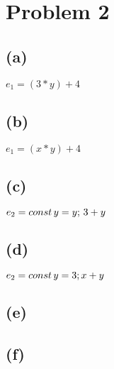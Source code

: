 \documentclass[11pt, oneside]{article}
\newcommand{\forceindent}{\leavevmode{\parindent=1.5em\indent}}
\begin{document}
\section{Problem 2}
\subsection*{(a)}
\forceindent \par $e_1 = (3 * y) + 4$

\subsection*{(b)}
\forceindent \par $e_1 = (x * y) + 4$

\subsection*{(c)}
\forceindent \par $e_2 = const \thinspace y = y; \thinspace 3 + y$

\subsection*{(d)}
\forceindent \par $e_2 = const \thinspace y = 3; x + y$

\subsection*{(e)}
\forceindent \par 

\subsection*{(f)}
\forceindent \par 
\end{document}
